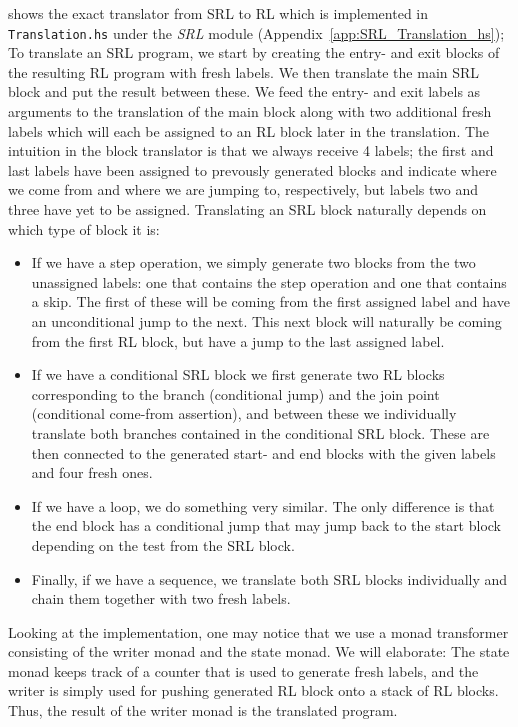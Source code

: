 \cite[Fig.~21]{REV} shows the exact translator from SRL to RL which is implemented in \texttt{Translation.hs} under the \textit{SRL} module (Appendix~\ref{app:SRL_Translation_hs}); To translate an SRL program, we start by creating the entry- and exit blocks of the resulting RL program with fresh labels. We then translate the main SRL block and put the result between these. We feed the entry- and exit labels as arguments to the translation of the main block along with two additional fresh labels which will each be assigned to an RL block later in the translation. The intuition in the block translator is that we always receive 4 labels; the first and last labels have been assigned to prevously generated blocks and indicate where we come from and where we are jumping to, respectively, but labels two and three have yet to be assigned. Translating an SRL block naturally depends on which type of block it is:
\begin{itemize}
  \item If we have a step operation, we simply generate two blocks from the two unassigned labels: one that contains the step operation and one that contains a skip. The first of these will be coming from the first assigned label and have an unconditional jump to the next. This next block will naturally be coming from the first RL block, but have a jump to the last assigned label.
  \item If we have a conditional SRL block we first generate two RL blocks corresponding to the branch (conditional jump) and the join point (conditional come-from assertion), and between these we individually translate both branches contained in the conditional SRL block. These are then connected to the generated start- and end blocks with the given labels and four fresh ones.
  \item If we have a loop, we do something very similar. The only difference is that the end block has a conditional jump that may jump back to the start block depending on the test from the SRL block.
  \item Finally, if we have a sequence, we translate both SRL blocks individually and chain them together with two fresh labels.
\end{itemize}
Looking at the implementation, one may notice that we use a monad transformer consisting of the writer monad and the state monad. We will elaborate: The state monad keeps track of a counter that is used to generate fresh labels, and the writer is simply used for pushing generated RL block onto a stack of RL blocks. Thus, the result of the writer monad is the translated program.




